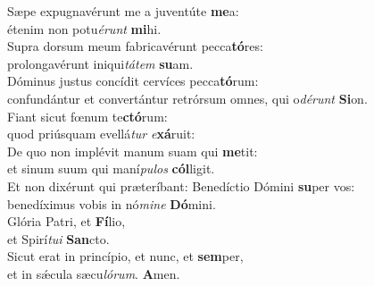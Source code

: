\evenverse Sæpe expugnavérunt me a juventúte \textbf{me}a:~\*\\
\evenverse étenim non potu\textit{é}\textit{runt} \textbf{mi}hi.\\
\oddverse Supra dorsum meum fabricavérunt pecca\textbf{tó}res:~\*\\
\oddverse prolongavérunt iniqui\textit{tá}\textit{tem} \textbf{su}am.\\
\evenverse Dóminus justus concídit cervíces pecca\textbf{tó}rum:~\*\\
\evenverse confundántur et convertántur retrórsum omnes, qui o\textit{dé}\textit{runt} \textbf{Si}on.\\
\oddverse Fiant sicut fœnum te\textbf{ctó}rum:~\*\\
\oddverse quod priúsquam evellá\textit{tur} \textit{e}\textbf{xá}ruit:\\
\evenverse De quo non implévit manum suam qui \textbf{me}tit:~\*\\
\evenverse et sinum suum qui maní\textit{pu}\textit{los} \textbf{cól}ligit.\\
\oddverse Et non dixérunt qui præteríbant: Benedíctio Dómini \textbf{su}per vos:~\*\\
\oddverse benedíximus vobis in nó\textit{mi}\textit{ne} \textbf{Dó}mini.\\
\evenverse Glória Patri, et \textbf{Fí}lio,~\*\\
\evenverse et Spirí\textit{tu}\textit{i} \textbf{San}cto.\\
\oddverse Sicut erat in princípio, et nunc, et \textbf{sem}per,~\*\\
\oddverse et in sǽcula sæcu\textit{ló}\textit{rum}. \textbf{A}men.\\
